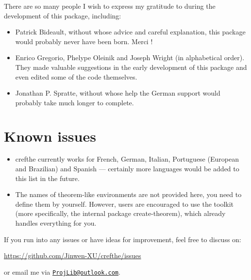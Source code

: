 \documentclass[classical]{einfart}
\newcommand{\crefthepackage}{\textsf{crefthe}}
\begin{document}
There are so many people I wish to express my gratitude to during the development of this package, including:

\begin{itemize}
    \item Patrick Bideault, without whose advice and careful explanation, this package would probably never have been born. Merci !
    \item Enrico Gregorio, Phelype Oleinik and Joseph Wright (in alphabetical order). They made valuable suggestions in the early development of this package and even edited some of the code themselves.
    \item Jonathan P. Spratte, without whose help the German support would probably take much longer to complete.
\end{itemize}


\bigskip
\section{Known issues}
\begin{itemize}
    \item \crefthepackage{} currently works for French, German, Italian, Portuguese (European and Brazilian) and Spanish --- certainly more languages would be added to this list in the future.
    \item The names of theorem-like environments are not provided here, you need to define them by yourself. However, users are encouraged to use the \ProjLib{} toolkit (more specifically, the internal package \textsf{create-theorem}), which already handles everything for you.
\end{itemize}

\medskip
If you run into any issues or have ideas for improvement, feel free to discuss on:
\begin{center}
    \url{https://github.com/Jinwen-XU/crefthe/issues}
\end{center}
or email me via \href{mailto:ProjLib@outlook.com}{\texttt{ProjLib@outlook.com}}.
\end{document}
